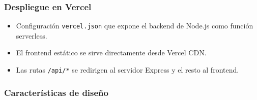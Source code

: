 \documentclass[12pt,a4paper]{article}
\begin{document}
\subsubsection{Despliegue en Vercel}

\begin{itemize}
    \item Configuración \texttt{vercel.json} que expone el backend de Node.js como función serverless.
    \item El frontend estático se sirve directamente desde Vercel CDN.
    \item Las rutas \texttt{/api/*} se redirigen al servidor Express y el resto al frontend.
\end{itemize}

\subsubsection{Características de diseño}
\end{document}
